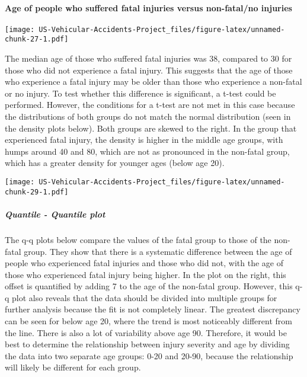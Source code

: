\documentclass[]{article}
\let\oldparagraph\paragraph
\renewcommand{\paragraph}[1]{\oldparagraph{#1}\mbox{}}
\let\oldsubparagraph\subparagraph
\renewcommand{\subparagraph}[1]{\oldsubparagraph{#1}\mbox{}}
\begin{document}
\hypertarget{age-of-people-who-suffered-fatal-injuries-versus-non-fatalno-injuries}{%
\paragraph{Age of people who suffered fatal injuries versus non-fatal/no
injuries}\label{age-of-people-who-suffered-fatal-injuries-versus-non-fatalno-injuries}}

\texttt{[image: US-Vehicular-Accidents-Project\_files/figure-latex/unnamed-chunk-27-1.pdf]}

The median age of those who suffered fatal injuries was 38, compared to
30 for those who did not experience a fatal injury. This suggests that
the age of those who experience a fatal injury may be older than those
who experience a non-fatal or no injury. To test whether this difference
is significant, a t-test could be performed. However, the conditions for
a t-test are not met in this case because the distributions of both
groups do not match the normal distribution (seen in the density plots
below). Both groups are skewed to the right. In the group that
experienced fatal injury, the density is higher in the middle age
groups, with humps around 40 and 80, which are not as pronounced in the
non-fatal group, which has a greater density for younger ages (below age
20).

\texttt{[image: US-Vehicular-Accidents-Project\_files/figure-latex/unnamed-chunk-29-1.pdf]}

\hypertarget{quantile---quantile-plot}{%
\subparagraph{Quantile - Quantile plot}\label{quantile---quantile-plot}}

The q-q plots below compare the values of the fatal group to those of
the non-fatal group. They show that there is a systematic difference
between the age of people who experienced fatal injuries and those who
did not, with the age of those who experienced fatal injury being
higher. In the plot on the right, this offset is quantified by adding 7
to the age of the non-fatal group. However, this q-q plot also reveals
that the data should be divided into multiple groups for further
analysis because the fit is not completely linear. The greatest
discrepancy can be seen for below age 20, where the trend is most
noticeably different from the line. There is also a lot of variability
above age 90. Therefore, it would be best to determine the relationship
between injury severity and age by dividing the data into two separate
age groups: 0-20 and 20-90, because the relationship will likely be
different for each group.
\end{document}
